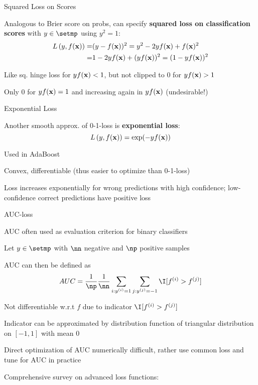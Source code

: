 \documentclass[11pt,compress,t,notes=noshow, xcolor=table]{beamer}
\begin{document}
\begin{framei}[sep=M]{Squared Loss on Scores}


\item Analogous to Brier score on probs, can specify \textbf{squared loss on classification scores} with $y \in \setmp$ using $y^2=1$:
\begin{align*}
L\left(y, f(\mathbf{x})\right) =&(y - f(\mathbf{x}))^2 = y^2 - 2y f(\mathbf{x}) + f(\mathbf{x})^2\\
=&1 - 2y f(\mathbf{x}) + (y f(\mathbf{x}))^2 = (1 - y f(\mathbf{x}))^2
\end{align*}
\item Like sq. hinge loss for $y f(\mathbf{x}) < 1$, but not clipped to $0$ for $y f(\mathbf{x})>1$
\item Only 0 for $y f(\mathbf{x}) = 1$ and increasing again in $y f(\mathbf{x})$ (undesirable!)



\end{framei}



\begin{framei}[sep=M]{Exponential Loss}

\item Another smooth 
approx. of 0-1-loss is \textbf{exponential loss}:
$$L\left(y, f(\mathbf{x})\right) = \exp(-y f(\mathbf{x}))$$ 
\item Used in AdaBoost
\item Convex, differentiable (thus easier to optimize than 0-1-loss)
\item Loss increases exponentially for wrong predictions with high confidence; low-confidence correct predictions have positive loss


\end{framei}

\begin{frame}{AUC-loss}

\begin{itemizeM}
\item AUC often used as evaluation criterion for binary classifiers
\item Let $y \in \setmp$ with $\nn$ negative and $\np$ positive samples %
\item AUC can then be defined as
$$AUC = \frac{1}{\np} \frac{1}{\nn} \sum_{i: \yi = 1} \sum_{j: \yi[j] = -1} \I [f^{(i)} > f^{(j)}]$$
\item Not differentiable w.r.t $f$ due to indicator $\I [f^{(i)} > f^{(j)}]$
\item Indicator can be approximated by distribution function of triangular distribution on $[-1, 1]$ with mean $0$
\item Direct optimization of AUC numerically difficult, rather use common loss and tune for AUC in practice
\end{itemizeM}
\vfill
Comprehensive survey on advanced loss functions: 

\end{frame}

\endlecture
\end{document}
